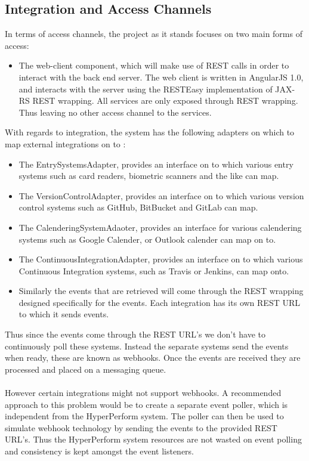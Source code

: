 \documentclass[11pt,a4paper]{article}
\begin{document}
\subsection{Integration and Access Channels}
In terms of access channels, the project as it stands focuses on two main forms of access:
\begin{itemize}
	\item The web-client component, which will make use of REST calls in order to interact with the back end server. The web client is written in AngularJS 1.0, and interacts with the server using the RESTEasy implementation of JAX-RS REST wrapping. All services are only exposed through REST wrapping. Thus leaving no other access channel to the services.
\end{itemize}
With regards to integration, the system has the following adapters on which to map external integrations on to :
\begin{itemize}
	\item The EntrySystemsAdapter, provides an interface on to which various entry systems such as card readers, biometric scanners and the like can map.
	\item The VersionControlAdapter, provides an interface on to which various version control systems such as GitHub, BitBucket and GitLab can map.
	\item The CalenderingSystemAdaoter, provides an interface for various calendering systems such as Google Calender, or Outlook calender can map on to.
	\item The ContinuousIntegrationAdapter, provides an interface on to which various Continuous Integration systems, such as Travis or Jenkins, can map onto.
	
	\item Similarly the events that are retrieved will come through the REST wrapping designed specifically for the events. Each integration has its own REST URL to which it sends events.
\end{itemize}
Thus since the events come through the REST URL's we don't have to continuously poll these systems. Instead the separate systems send the events when ready, these are known as webhooks. Once the events are received they are processed and placed on a messaging queue.\\ \\
However certain integrations might not support webhooks. A recommended approach to this problem would be to create a separate event poller, which is independent from the HyperPerform system. The poller can then be used to simulate webhook technology by sending the events to the provided REST URL's. Thus the HyperPerform system resources are not wasted on event polling and consistency is kept amongst the event listeners.
\end{document}
